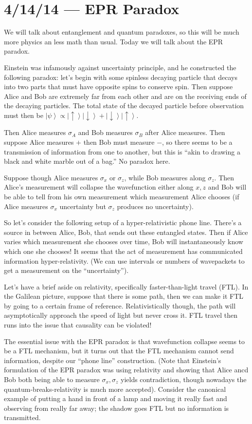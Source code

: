 \documentclass[10pt]{report}
\newcommand{\ket}[1]{\left|#1\right>}
\begin{document}
\chapter{4/14/14 --- EPR Paradox}

We will talk about entanglement and quantum paradoxes, so this will be much more physics an less math than usual. Today we will talk about the EPR paradox.

Einstein was infamously against uncertainty principle, and he constructed the following paradox: let's begin with some spinless decaying particle that decays into two parts that must have opposite spins to conserve spin. Then suppose Alice and Bob are extremely far from each other and are on the receiving ends of the decaying particles. The total state of the decayed particle before observation must then be $\ket{\psi} \propto \ket{\uparrow}\ket{\downarrow} + \ket{\downarrow}\ket{\uparrow}$.

Then Alice measures $\sigma_A$ and Bob measures $\sigma_B$ after Alice measures. Then suppose Alice measures $+$ then Bob must measure $-$, so there seems to be a transmission of information from one to another, but this is ``akin to drawing a black and white marble out of a bag.'' No paradox here.

Suppose though Alice measures $\sigma_x$ or $\sigma_z$, while Bob measures along $\sigma_z$. Then Alice's measurement will collapse the wavefunction either along $x,z$ and Bob will be able to tell from his own measurement which measurement Alice chooses (if Alice measures $\sigma_x$ uncertainty but $\sigma_z$ produces no uncertainty).

So let's consider the following setup of a hyper-relativistic phone line. There's a source in between Alice, Bob, that sends out these entangled states. Then if Alice varies which measurement she chooses over time, Bob will instantaneously know which one she chooses! It seems that the act of measurement has communicated information hyper-relativity. (We can use intervals or numbers of wavepackets to get a measurement on the ``uncertainty'').

Let's have a brief aside on relativity, specifically faster-than-light travel (FTL). In the Galilean picture, suppose that there is some path, then we can make it FTL by going to a certain frame of reference. Relativistically though, the path will asymptotically approach the speed of light but never cross it. FTL travel then runs into the issue that causality can be violated! 

The essential issue with the EPR paradox is that wavefunction collapse seems to be a FTL mechanism, but it turns out that the FTL mechanism cannot send information, despite our ``phone line'' construction. (Note that Einstein's formulation of the EPR paradox was using relativity and showing that Alice ancd Bob both being able to measure $\sigma_x, \sigma_z$ yields contradiction, though nowadays the quantum-breaks-relativity is much more accepted). Consider the canonical example of putting a hand in front of a lamp and moving it really fast and observing from really far away; the shadow goes FTL but no information is transmitted.
\end{document}
